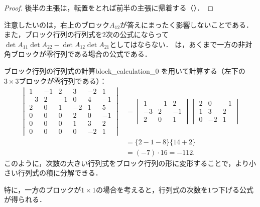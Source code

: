 \begin{tleftbar}
\begin{proof}
  後半の主張は，転置をとれば前半の主張に帰着する（）．
\end{proof}
\end{tleftbar}

注意したいのは，右上のブロック$A_{12}$が答えにまったく影響しないことである．
また，ブロック行列の行列式を$2$次の公式にならって$\det A_{11}\det A_{22} - \det A_{12}\det A_{21}$としてはならない．
は，あくまで一方の非対角ブロックが零行列である場合の公式である．

\begin{example}{ブロック行列の行列式の計算}{block_calculation_0}
  を用いて計算する（左下の$3 \times 3$ブロックが零行列である）：
  \begin{align*}
    \begin{vmatrix}
      1 & -1 &  2 &  3 & -2 &  1 \\
     -3 &  2 & -1 &  0 &  4 & -1 \\
      2 &  0 &  1 & -2 &  1 &  5 \\
      0 &  0 &  0 &  2 &  0 & -1 \\
      0 &  0 &  0 &  1 &  3 &  2 \\
      0 &  0 &  0 &  0 & -2 &  1
    \end{vmatrix}
    &=
    \begin{vmatrix}
      1 & -1 &  2 \\
     -3 &  2 & -1 \\
      2 &  0 &  1
    \end{vmatrix}
    \begin{vmatrix}
      2 &  0 & -1 \\
      1 &  3 &  2 \\
      0 & -2 &  1
    \end{vmatrix} \\
    &=
    \{2-1-8\}\{14+2\} \\
    &=(-7)\cdot 16=-112.
  \end{align*}
  このように，次数の大きい行列式をブロック行列の形に変形することで，より小さい行列式の積に分解できる．
\end{example}

特に，一方のブロックが$1 \times 1$の場合を考えると，行列式の次数を$1$つ下げる公式が得られる．

